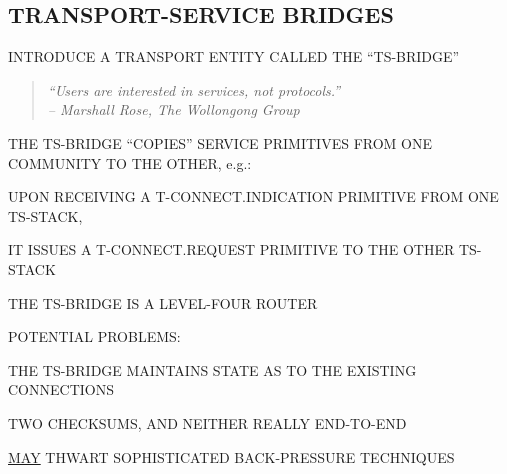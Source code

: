 \begin{bwslide}
\part*	{TRANSPORT-SERVICE BRIDGES}\bf

\begin{nrtc}
\item	INTRODUCE A TRANSPORT ENTITY CALLED THE ``TS-BRIDGE''
\begin{quote}\em
``Users are interested in services, not protocols.''\\ \raggedleft
-- Marshall Rose, The Wollongong Group
\end{quote}

\item	THE TS-BRIDGE ``COPIES'' SERVICE PRIMITIVES FROM ONE COMMUNITY TO THE
	OTHER, e.g.:
    \begin{nrtc}
    \item	UPON RECEIVING A T-CONNECT.INDICATION PRIMITIVE FROM ONE
		TS-STACK,

    \item	IT ISSUES A T-CONNECT.REQUEST PRIMITIVE TO THE OTHER TS-STACK
    \end{nrtc}
\end{nrtc}
\end{bwslide}




\begin{bwslide}

\begin{nrtc}
\item	THE TS-BRIDGE IS A LEVEL-FOUR ROUTER

\item	POTENTIAL PROBLEMS:
    \begin{nrtc}
    \item	THE TS-BRIDGE MAINTAINS STATE AS TO THE EXISTING CONNECTIONS

    \item	TWO CHECKSUMS, AND NEITHER REALLY END-TO-END

    \item	\underline{MAY} THWART SOPHISTICATED BACK-PRESSURE TECHNIQUES
    \end{nrtc}
\end{nrtc}
\end{bwslide}


